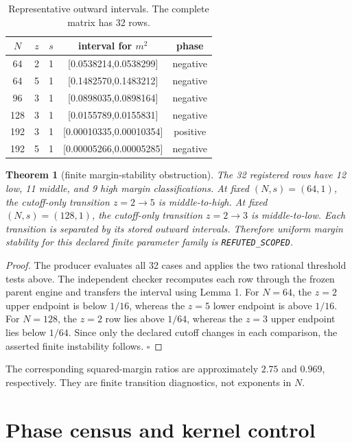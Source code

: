 \documentclass[11pt]{article}
\newtheorem{theorem}{Theorem}
\begin{document}
\begin{table}[h]
\centering
\scriptsize
\begin{tabular}{c c c c c}
\toprule
 $N$ & $z$ & $s$ & interval for $m^2$ & phase\\
\midrule
 64 & 2 & 1 & [0.0538214,0.0538299] & negative\\
 64 & 5 & 1 & [0.1482570,0.1483212] & negative\\
 96 & 3 & 1 & [0.0898035,0.0898164] & negative\\
 128 & 3 & 1 & [0.0155789,0.0155831] & negative\\
 192 & 3 & 1 & [0.00010335,0.00010354] & positive\\
 192 & 5 & 1 & [0.00005266,0.00005285] & negative\\
\bottomrule
\end{tabular}
\caption{Representative outward intervals.  The complete matrix has 32 rows.}
\end{table}

\begin{theorem}[finite margin-stability obstruction]
The 32 registered rows have 12 low, 11 middle, and 9 high margin
classifications.  At fixed \((N,s)=(64,1)\), the cutoff-only transition
\(z=2\to5\) is middle-to-high.  At fixed \((N,s)=(128,1)\), the
cutoff-only transition \(z=2\to3\) is middle-to-low.  Each transition is
separated by its stored outward intervals.  Therefore uniform margin
stability for this declared finite parameter family is \texttt{REFUTED\_SCOPED}.
\end{theorem}

\begin{proof}
The producer evaluates all 32 cases and applies the two rational threshold
tests above.  The independent checker recomputes each row through the frozen
parent engine and transfers the interval using Lemma 1.  For \(N=64\), the
\(z=2\) upper endpoint is below \(1/16\), whereas the \(z=5\) lower endpoint
is above \(1/16\).  For \(N=128\), the \(z=2\) row lies above \(1/64\),
whereas the \(z=3\) upper endpoint lies below \(1/64\).  Since only the
declared cutoff changes in each comparison, the asserted finite instability
follows.  \(\square\)
\end{proof}

The corresponding squared-margin ratios are approximately \(2.75\) and
\(0.969\), respectively.  They are finite transition diagnostics, not
exponents in \(N\).

\section{Phase census and kernel control}
\end{document}
